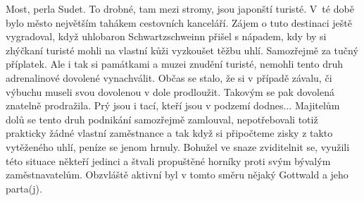 
Most, perla Sudet. To drobné, tam mezi stromy, jsou japonští turisté.
V~té době bylo město největším tahákem cestovních kanceláří. Zájem o
tuto destinaci ještě vygradoval, když uhlobaron Schwartzschweinn
přišel s nápadem, kdy by si zhýčkaní turisté mohli na vlastní kůži
vyzkoušet těžbu uhlí. Samozřejmě za tučný příplatek. Ale i tak si
památkami a muzei znudění turisté, nemohli tento druh adrenalinové
dovolené vynachválit. Občas se stalo, že si v případě závalu, či
výbuchu museli svou dovolenou v dole prodloužit. Takovým se pak
dovolená znatelně prodražila. Prý jsou i tací, kteří jsou v podzemí
dodnes... Majitelům dolů se tento druh podnikání samozřejmě zamlouval,
nepotřebovali totiž prakticky žádné vlastní zaměstnance a tak když si
připočteme zisky z takto vytěženého uhlí, peníze se jenom hrnuly.
Bohužel ve snaze zviditelnit se, využili této situace někteří jedinci
a štvali propuštěné horníky proti svým bývalým zaměstnavatelům.
Obzvláště aktivní byl v tomto směru nějaký Gottwald a jeho parta(j).

